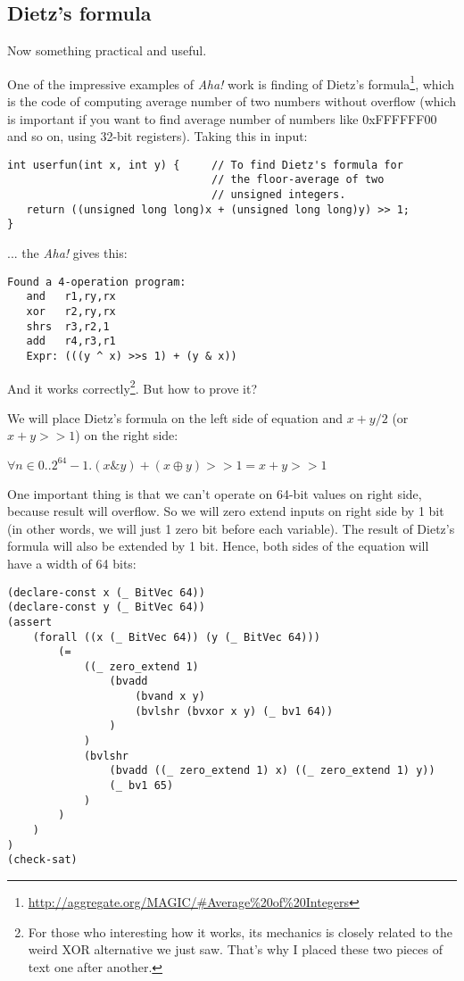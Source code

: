 \subsection{Dietz's formula}

Now something practical and useful.

One of the impressive examples of \textit{Aha!} work is finding of Dietz's formula\footnote{\url{http://aggregate.org/MAGIC/\#Average\%20of\%20Integers}},
which is the code of computing average number of two numbers without overflow (which is important if you want to find average number of numbers like 0xFFFFFF00 and so on, using 32-bit registers).
Taking this in input:

\begin{lstlisting}
int userfun(int x, int y) {     // To find Dietz's formula for
                                // the floor-average of two
                                // unsigned integers.
   return ((unsigned long long)x + (unsigned long long)y) >> 1;
}
\end{lstlisting}

... the \textit{Aha!} gives this:

\begin{lstlisting}
Found a 4-operation program:
   and   r1,ry,rx
   xor   r2,ry,rx
   shrs  r3,r2,1
   add   r4,r3,r1
   Expr: (((y ^ x) >>s 1) + (y & x))
\end{lstlisting}

And it works correctly\footnote{For those who interesting how it works, its mechanics is closely related to the weird XOR alternative we just saw.
That's why I placed these two pieces of text one after another.}.
But how to prove it?

We will place Dietz's formula on the left side of equation and $x+y/2$ (or $x+y>>1$) on the right side:

\begin{center}
$\forall n \in 0..2^{64}-1 . (x\&y) + (x \oplus y)>>1 = x+y>>1$
\end{center}

One important thing is that we can't operate on 64-bit values on right side, because result will overflow.
So we will zero extend inputs on right side by 1 bit (in other words, we will just 1 zero bit before each variable).
The result of Dietz's formula will also be extended by 1 bit.
Hence, both sides of the equation will have a width of 64 bits:

\begin{lstlisting}
(declare-const x (_ BitVec 64))
(declare-const y (_ BitVec 64))
(assert 
	(forall ((x (_ BitVec 64)) (y (_ BitVec 64)))
		(=
			((_ zero_extend 1)
				(bvadd
					(bvand x y)
					(bvlshr (bvxor x y) (_ bv1 64))
				)
			)
			(bvlshr
				(bvadd ((_ zero_extend 1) x) ((_ zero_extend 1) y))
				(_ bv1 65)
			)
		)
	)
)
(check-sat)
\end{lstlisting}

